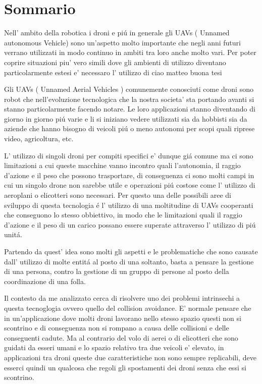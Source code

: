 \chapter*{Sommario} %
\label{sommario}


Nell' ambito della robotica i droni e piú in generale gli UAVs ( Unnamed autonomous Vehicle) sono un'aspetto molto importante che negli anni futuri verrano utilizzati in modo continuo in ambiti tra loro anche molto vari. Per poter coprire situazioni piu' vero simili dove gli ambienti di utilizzo diventano particolarmente estesi e' necessaro l' utilizzo di ciao matteo buona tesi

Gli UAVs ( Unnamed Aerial Vehicles ) comunemente conosciuti come droni sono robot che nell'evoluzione tecnologica che la nostra societa' sta portando avanti si stanno particolarmente facendo notare. Le loro applicazioni stanno diventando di giorno in giorno piú varie e li si iniziano vedere utilizzati sia da hobbisti sia da aziende che hanno bisogno di veicoli piú o meno autonomi per scopi quali riprese video, agricoltura, etc. 

L' utilizzo di singoli droni per compiti specifici e' dunque giá comune ma ci sono limitazioni a cui queste macchine vanno incontro quali l'autonomia, il raggio d'azione e il peso che possono trasportare, di conseguenza ci sono molti campi in cui un singolo drone non sarebbe utile e operazioni piú costose come l' utilizzo di aeroplani o elicotteri sono necessari. Per questo una delle possibili aree di sviluppo di questa tecnologia é l' utilizzo di una moltitudine di UAVs cooperanti che conseguono lo stesso obbiettivo, in modo che le limitazioni quali il raggio d'azione e il peso di un carico possano essere superate attraverso l' utilizzo di piú unitá. 

Partendo da quest' idea sono molti gli aspetti e le problematiche che sono causate dall' utilizzo di molte entitá al posto di una soltanto, basta a pensare la gestione di una persona, contro la gestione di un gruppo di persone al posto della coordinazione di una folla. 

Il contesto da me analizzato cerca di risolvere uno dei problemi intrinsechi a questa tecnoglogia ovvero quello del collision avoidance. E' normale pensare che in un'applicazione dove molti droni lavorano nello stesso spazio questi non si scontrino e di conseguenza non si rompano a causa delle collisioni e delle conseguenti cadute. Ma al contrario del volo di aerei o di elicotteri che sono guidati da esseri umani e lo spazio relativo tra due veicoli e' elevato, in applicazioni tra droni queste due caratteristiche non sono sempre replicabili, deve esserci quindi un qualcosa che regoli gli spostamenti dei droni senza che essi si scontrino.

